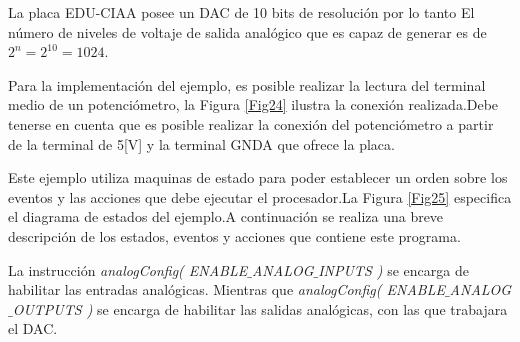 \documentclass[12pt,letterpaper]{article}
\begin{document}
La placa EDU-CIAA posee un DAC de 10 bits de resolución por lo tanto El número de niveles de voltaje de salida analógico que es capaz de generar es de $2^{n}=2^{10}=1024$.

Para la implementación del ejemplo, es posible realizar la lectura del terminal medio de un potenciómetro, la Figura \ref{Fig24} ilustra la conexión realizada.Debe tenerse en cuenta que es posible realizar la conexión del potenciómetro a partir de la terminal de 5[V] y la terminal GNDA que ofrece la placa.

Este ejemplo utiliza maquinas de estado para poder establecer un orden sobre los eventos y las acciones que debe ejecutar el procesador.La Figura \ref{Fig25} especifica el diagrama de estados del ejemplo.A continuación se realiza una breve descripción de los estados, eventos y acciones que contiene este programa.

La instrucción \textit{analogConfig( ENABLE$\_$ANALOG$\_$INPUTS )} se encarga de habilitar las entradas analógicas. Mientras que \textit{analogConfig( ENABLE$\_$ANALOG$\_$OUTPUTS )} se encarga de habilitar las salidas analógicas, con las que trabajara el DAC.
\end{document}
